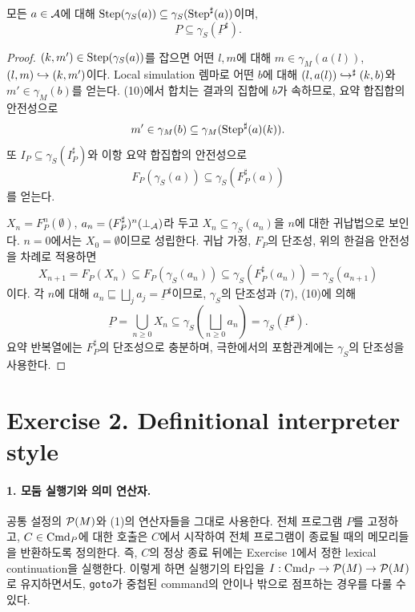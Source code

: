 \documentclass[a4paper,10pt]{article}
\begin{document}
\begin{theorem}
모든 $a\in\mathcal A$에 대해
$\operatorname{Step}(\gamma_S(a))\subseteq\gamma_S(\operatorname{Step}^\sharp(a))$이며,
\[
             \underbar{P}\subseteq\gamma_S(\underbar{P}^\sharp).
\]
\end{theorem}
\begin{proof}
$(k,m')\in\operatorname{Step}(\gamma_S(a))$를 잡으면 어떤 $l,m$에 대해
$m\in\gamma_M(a(l))$, $(l,m)\hookrightarrow(k,m')$이다.
Local simulation 렘마로 어떤 $b$에 대해
$(l,a(l))\hookrightarrow^\sharp(k,b)$와 $m'\in\gamma_M(b)$를 얻는다.
(10)에서 합치는 결과의 집합에 $b$가 속하므로, 요약 합집합의 안전성으로
\[
 m'\in\gamma_M(b)\subseteq\gamma_M(\operatorname{Step}^\sharp(a)(k)).
\]
또 $I_P\subseteq\gamma_S(I_P^\sharp)$와 이항 요약 합집합의 안전성으로
\[
 F_P(\gamma_S(a))\subseteq\gamma_S(F_P^\sharp(a))
\]
를 얻는다.

$X_n=F_P^n(\emptyset)$, $a_n=(F_P^\sharp)^n(\bot_{\mathcal A})$라 두고
$X_n\subseteq\gamma_S(a_n)$을 $n$에 대한 귀납법으로 보인다.
$n=0$에서는 $X_0=\emptyset$이므로 성립한다.
귀납 가정, $F_P$의 단조성, 위의 한걸음 안전성을 차례로 적용하면
\[
 X_{n+1}=F_P(X_n)
 \subseteq F_P(\gamma_S(a_n))
 \subseteq\gamma_S(F_P^\sharp(a_n))
 =\gamma_S(a_{n+1})
\]
이다.
각 $n$에 대해 $a_n\sqsubseteq\bigsqcup_j a_j=\underbar{P}^\sharp$이므로,
$\gamma_S$의 단조성과 (7), (10)에 의해
\[
 \underbar{P}=\bigcup_{n\ge0}X_n
 \subseteq\gamma_S\left(\bigsqcup_{n\ge0}a_n\right)
 =\gamma_S(\underbar{P}^\sharp).
\]
요약 반복열에는 $F_P^\sharp$의 단조성으로 충분하며,
극한에서의 포함관계에는 $\gamma_S$의 단조성을 사용한다.
\end{proof}

\section*{Exercise 2. Definitional interpreter style}

\paragraph{1. 모둠 실행기와 의미 연산자.}
공통 설정의 $\mathcal P(M)$와 (1)의 연산자들을 그대로 사용한다.
전체 프로그램 $P$를 고정하고, $C\in\mathrm{Cmd}_P$에 대한 호출은
$C$에서 시작하여 전체 프로그램이 종료될 때의 메모리들을 반환하도록 정의한다.
즉, $C$의 정상 종료 뒤에는 Exercise 1에서 정한 lexical continuation을 실행한다.
이렇게 하면 실행기의 타입을 $I:\mathrm{Cmd}_P\to \mathcal P(M)\to \mathcal P(M)$로 유지하면서도,
\texttt{goto}가 중첩된 command의 안이나 밖으로 점프하는 경우를 다룰 수 있다.
\end{document}
